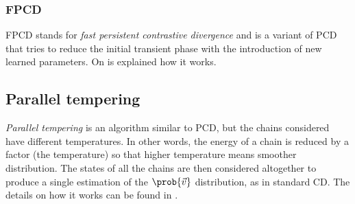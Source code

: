   \subsubsection{FPCD}
  FPCD stands for \emph{fast persistent contrastive divergence} and is a variant of PCD that tries
  to reduce the initial transient phase with the introduction of new learned parameters.
  On \cite{fischer2012introduction} is explained how  it works.
  
  \subsection{Parallel tempering}
  \emph{Parallel tempering} is an algorithm similar to PCD, but the chains
  considered have different temperatures. In other words, the energy of a
  chain is reduced by a factor (the temperature) so that higher temperature
  means smoother distribution. The states of all the chains are then considered altogether to
  produce a single estimation of the \(\prob{\vec{v}}\) distribution, as in standard CD.
  The details on how it works can be found in \cite{fischer2012introduction}.